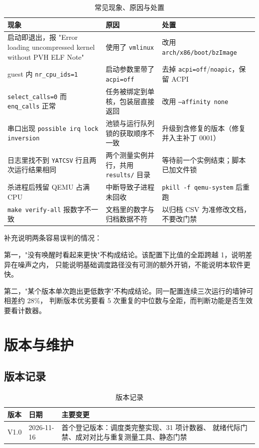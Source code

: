 \documentclass[11pt,a4paper]{article}
\newcommand{\code}[1]{\texttt{#1}}
\begin{document}
\begin{table}[H]
\centering
\caption{常见现象、原因与处置}
\label{tab:faq}
\small
\begin{tabular}{@{}p{4.6cm}p{4.6cm}p{5.2cm}@{}}
\toprule
现象 & 原因 & 处置 \\
\midrule
启动即退出，报 "Error loading uncompressed kernel without PVH ELF Note" &
使用了 \code{vmlinux} & 改用 \code{arch/x86/boot/bzImage} \\
guest 内 \code{nr\_cpu\_ids=1} & 启动参数里带了 \code{acpi=off} &
去掉 \code{acpi=off}/\code{noapic}，保留 ACPI \\
\code{select\_calls=0} 而 \code{enq\_calls} 正常 &
任务被绑定到单核，包装层直接返回 & 改用 \code{--affinity none} \\
串口出现 \code{possible irq lock inversion} &
池锁与运行队列锁的获取顺序不一致 & 升级到含修复的版本（修复并入主补丁 0001） \\
日志里找不到 \code{YATCSV} 行且两次运行结果相同 &
两个测量实例并行，共用 \code{results/} 目录 & 等待前一个实例结束；脚本已加文件锁 \\
杀进程后残留 QEMU 占满 CPU & 中断导致子进程未回收 & \code{pkill -f qemu-system} 后重跑 \\
\code{make verify-all} 报数字不一致 &
文档里的数字与归档数据不符 & 以归档 CSV 为准修改文档，不要改门禁 \\
\bottomrule
\end{tabular}
\end{table}

补充说明两条容易误判的情况：

第一，"没有唤醒时看起来更快"不构成结论。该配置下比值的全距跨越 1，说明差异在噪声之内，
只能说明基础调度路径没有可测的额外开销，不能说明本软件更快。

第二，"某个版本单次跑出更低数字"不构成结论。同一配置连续三次运行的墙钟可相差约 28\%，
判断版本优劣要看 5 次重复的中位数与全距，而判断功能是否生效要看计数器。

\section{版本与维护}

\subsection{版本记录}

\begin{table}[H]
\centering
\caption{版本记录}
\label{tab:versions}
\small
\begin{tabular}{@{}p{2.2cm}p{3.4cm}p{8.6cm}@{}}
\toprule
版本 & 日期 & 主要变更 \\
\midrule
V1.0 & 2026-11-16 & 首个登记版本：调度类完整实现、31 项计数器、
就绪代际门禁、成对对比与重复测量工具、静态门禁 \\
\bottomrule
\end{tabular}
\end{table}
\end{document}
